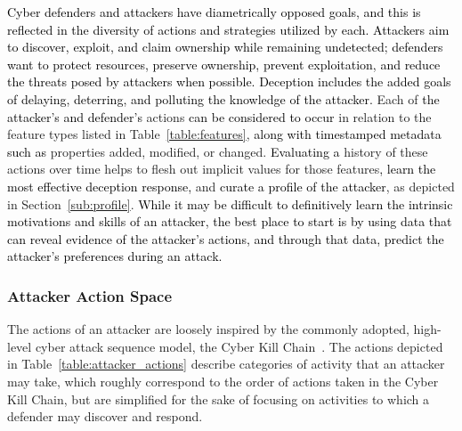 \documentclass{article}
\newcommand\mmm[1]{\textcolor{black}{#1}}
\newcommand\nnn[1]{\textcolor{black}{#1}}
\begin{document}
\mmm{Cyber defenders and attackers have diametrically opposed goals, and this is reflected in the diversity of actions and strategies utilized by each. Attackers aim to discover, exploit, and claim ownership while remaining undetected; defenders want to protect resources, preserve ownership, prevent exploitation, and reduce the threats posed by attackers when possible. Deception includes the added goals of delaying, deterring, and polluting the knowledge of the attacker.}
Each of \mmm{the attacker's and defender's} actions \mmm{can be considered} \nnn{to occur} in relation to the feature types listed in Table~\ref{table:features}, \mmm{along with \nnn{timestamped} metadata such as} properties added, modified, or changed. \mmm{Evaluating a} history of these actions over time helps to flesh out implicit values for those features\mmm{, learn the most effective deception response,} and \mmm{curate a profile of the attacker}, as depicted in Section~\ref{sub:profile}. \mmm{While it may be difficult to definitively learn the intrinsic motivations and skills of an attacker, the best place to start is by using data that can reveal evidence of the attacker's actions, and through that data, \nnn{predict} the attacker's \nnn{preferences during an}  attack.}


\subsubsection{Attacker Action Space}\label{sub:attacker_actions}
The actions of an attacker are loosely inspired by the commonly adopted, high-level cyber attack sequence model, the Cyber Kill Chain~\cite{hutchins_intelligence-driven_2011}. The actions depicted in Table~\ref{table:attacker_actions} describe categories of activity that an attacker may take, which roughly correspond to the order of actions taken in the Cyber Kill Chain, but are simplified for the sake of focusing on activities to which a defender may discover and respond.
\end{document}
